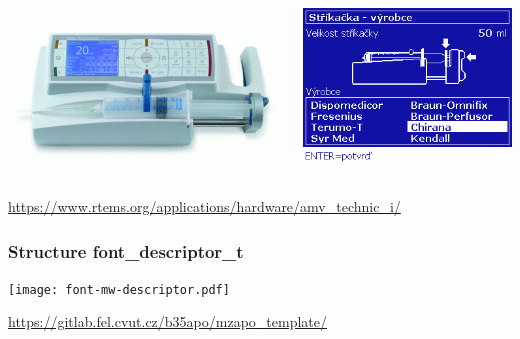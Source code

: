 \documentclass{beamer}
\begin{document}
\begin{frame}
\begin{columns}
\begin{column}{0.45\textwidth}
\begin{center}
    \includegraphics[width=1.0\textwidth]{fig/technic1-photo.png}
  \end{center}
  \vfil
\end{column}
\begin{column}{0.40\textwidth}
  \begin{center}
    \includegraphics[width=1.0\textwidth]{fig/technic1-screen-syringe.png}
  \end{center}
  \vfil
\end{column}
\end{columns}

{\small \url{https://www.rtems.org/applications/hardware/amv_technic_i/}}

\end{frame}


\begin{frame}
\frametitle{Structure font\_descriptor\_t}

\texttt{[image: font-mw-descriptor.pdf]}

\vfill

\href{https://gitlab.fel.cvut.cz/b35apo/mzapo_template/}{https://gitlab.fel.cvut.cz/b35apo/mzapo\_template/}

\end{frame}
\end{document}
